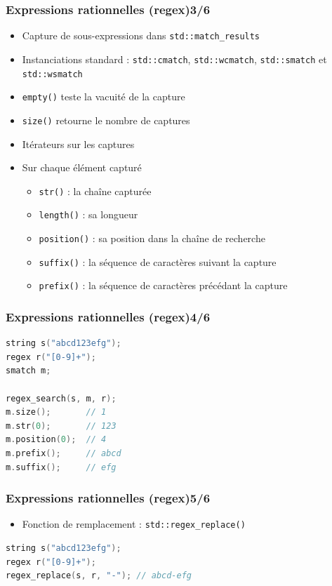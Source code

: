 \documentclass[C++.tex]{subfiles}
\begin{document}
\begin{frame}[fragile]
	\frametitle{Expressions rationnelles (regex)\titlehfill{}3/6}
	\begin{itemize}
		\item Capture de sous-expressions dans \lstinline|std::match_results|
		\item Instanciations standard : \lstinline|std::cmatch|, \lstinline|std::wcmatch|, \lstinline|std::smatch| et \lstinline|std::wsmatch|
		\item \lstinline|empty()| teste la vacuité de la capture
		\item \lstinline|size()| retourne le nombre de captures
		\item Itérateurs sur les captures
		\item Sur chaque élément capturé
		\begin{itemize}
			\item \lstinline|str()| : la chaîne capturée
			\item \lstinline|length()| : sa longueur
			\item \lstinline|position()| : sa position dans la chaîne de recherche
			\item \lstinline|suffix()| : la séquence de caractères suivant la capture
			\item \lstinline|prefix()| : la séquence de caractères précédant la capture
		\end{itemize}
	\end{itemize}
\end{frame}

\begin{frame}[fragile]
	\frametitle{Expressions rationnelles (regex)\titlehfill{}4/6}
	\begin{lstlisting}[language=C++]
string s("abcd123efg");
regex r("[0-9]+");
smatch m;

regex_search(s, m, r);
m.size();       // 1
m.str(0);       // 123
m.position(0);  // 4
m.prefix();     // abcd
m.suffix();     // efg\end{lstlisting}
\end{frame}

\begin{frame}[fragile]
	\frametitle{Expressions rationnelles (regex)\titlehfill{}5/6}
	\begin{itemize}
		\item Fonction de remplacement : \lstinline|std::regex_replace()|
	\end{itemize}

	\begin{lstlisting}[language=C++]
string s("abcd123efg");
regex r("[0-9]+");
regex_replace(s, r, "-"); // abcd-efg\end{lstlisting}
\end{frame}
\end{document}
